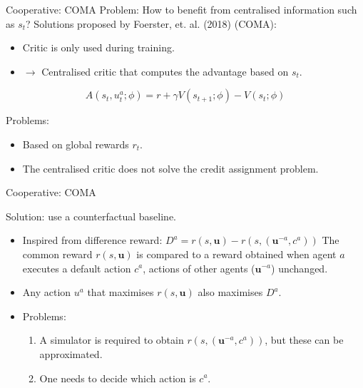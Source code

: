 \documentclass[9pt, hyperref={pdfusetitle,colorlinks=true,allcolors=DarkBlue}]{beamer}
\begin{document}
\begin{frame}{Cooperative: COMA}
Problem: How to benefit from centralised information such as $s_t$?
\vfill
Solutions proposed by Foerster, et. al. (2018) (COMA):
\begin{itemize}
    \item Critic is only used during training.
    \item $\rightarrow$ Centralised critic that computes the advantage based on $s_t$.
\end{itemize}

\begin{equation*}
    A(s_t,u^a_t; \phi) = r + \gamma V(s_{t+1}; \phi) - V(s_t; \phi)
\end{equation*}

\vfill

Problems: 
\begin{itemize}
    \item Based on global rewards $r_t$.
    \item The centralised critic does not solve the credit assignment problem.
\end{itemize}
\vfill

\end{frame}
\begin{frame}{Cooperative: COMA}

Solution: use a counterfactual baseline.
\vfill
\begin{itemize}
    \item Inspired from difference reward: 
    \vfill
    $D^a=r(s, \bm{u}) - r(s, (\bm{u}^{-a}, c^a))$
    \vfill
    The common reward $r(s, \bm{u})$ is compared to a reward obtained when agent $a$ executes a default action $c^a$, actions of other agents ($\bm{u}^{-a}$) unchanged.
    \vfill
    \item Any action $u^a$ that maximises $r(s, \bm{u})$ also maximises $D^a$.
    \vfill
    \item Problems:
    \begin{enumerate}
        \item A simulator is required to obtain $r(s, (\bm{u}^{-a}, c^a))$, but these can be approximated.
        \item One needs to decide which action is $c^a$.
    \end{enumerate}
\end{itemize}

\end{frame}
\end{document}

